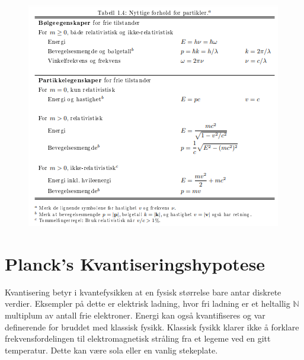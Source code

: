 \begin{figure}[ht!]
  \centering
  \includegraphics[scale = 1]{Figures/Nyttige forhold for partikler.png}
  \caption{}
  \label{fig: Nyttige forhold for partikler}
\end{figure}

\newpage

\section{Planck's Kvantiseringshypotese}
Kvantisering betyr i kvantefysikken at en fysisk størrelse bare antar diskrete verdier. Eksempler på dette er elektrisk ladning, hvor fri ladning er et heltallig $ \mathbb{N} $ multiplum av antall frie elektroner. Energi kan også kvantifiseres og var definerende for bruddet med klassisk fysikk. Klassisk fysikk klarer ikke å forklare frekvensfordelingen til elektromagnetisk stråling fra et legeme ved en gitt temperatur. Dette kan være sola eller en vanlig stekeplate. 
